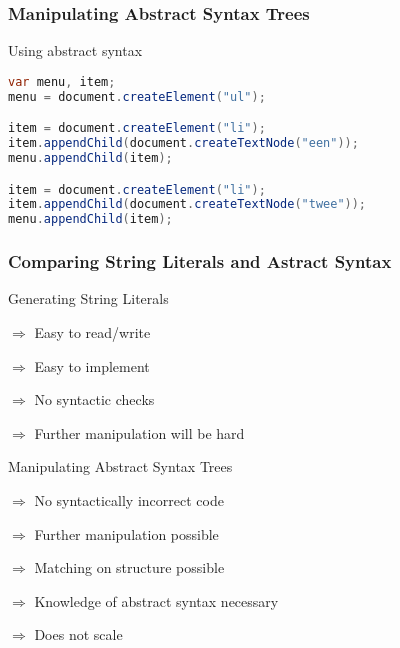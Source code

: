 \documentclass{beamer}
\begin{document}
\begin{frame}[fragile]

  \frametitle{Manipulating Abstract Syntax Trees}

  \begin{block}{Using abstract syntax}
    \begin{lstlisting}[language=Java]
var menu, item;
menu = document.createElement("ul");

item = document.createElement("li");
item.appendChild(document.createTextNode("een"));
menu.appendChild(item);

item = document.createElement("li");
item.appendChild(document.createTextNode("twee"));
menu.appendChild(item);
    \end{lstlisting}
  \end{block}

\end{frame}


\begin{frame}

  \frametitle{Comparing String Literals and Astract Syntax}

  \begin{block}{Generating String Literals}
    \begin{description}
      \item{\color{darkgreen}$\Rightarrow$} Easy to read/write
      \item{\color{darkgreen}$\Rightarrow$} Easy to implement
      \item{\color{darkred}$\Rightarrow$} No syntactic checks
      \item{\color{darkred}$\Rightarrow$} Further manipulation will be hard
    \end{description}
  \end{block}

  \begin{block}{Manipulating Abstract Syntax Trees}
    \begin{description}
      \item{\color{darkgreen}$\Rightarrow$} No syntactically incorrect code
      \item{\color{darkgreen}$\Rightarrow$} Further manipulation possible
      \item{\color{darkgreen}$\Rightarrow$} Matching on structure possible
      \item{\color{darkred}$\Rightarrow$} Knowledge of abstract syntax necessary
      \item{\color{darkred}$\Rightarrow$} Does not scale
    \end{description}
  \end{block}

\end{frame}
\end{document}
